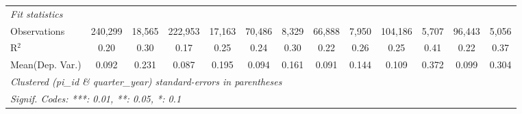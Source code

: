 \begin{tabular}{lcccccccccccc}
   \midrule
   \emph{Fit statistics}\\
   Observations                                               & 240,299        & 18,565         & 222,953        & 17,163         & 70,486         & 8,329         & 66,888         & 7,950         & 104,186        & 5,707          & 96,443         & 5,056\\  
   R$^2$                                                      & 0.20           & 0.30           & 0.17           & 0.25           & 0.24           & 0.30          & 0.22           & 0.26          & 0.25           & 0.41           & 0.22           & 0.37\\  
Mean(Dep. Var.) & 0.092 & 0.231 & 0.087 & 0.195 & 0.094 & 0.161 & 0.091 & 0.144 & 0.109 & 0.372 & 0.099 & 0.304 \\
   \midrule \midrule
   \multicolumn{13}{l}{\emph{Clustered (pi\_id \& quarter\_year) standard-errors in parentheses}}\\
   \multicolumn{13}{l}{\emph{Signif. Codes: ***: 0.01, **: 0.05, *: 0.1}}\\
\end{tabular}
\par\endgroup

